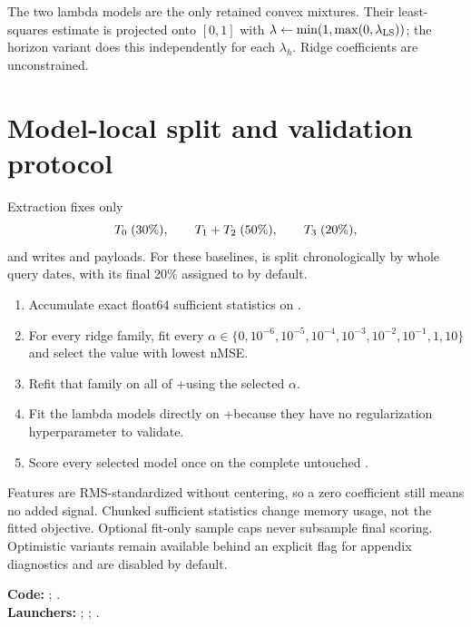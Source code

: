 \documentclass[10pt]{article}
\begin{document}
The two lambda models are the only retained convex mixtures. Their
least-squares estimate is projected onto $[0,1]$ with
$\lambda\leftarrow\min(1,\max(0,\lambda_{\rm LS}))$; the horizon variant
does this independently for each $\lambda_h$. Ridge coefficients are
unconstrained.

\section{Model-local split and validation protocol}
Extraction fixes only
\[
 T_0\;(30\%),\qquad T_1+T_2\;(50\%),\qquad T_3\;(20\%),
\]
and writes  and  payloads. For these baselines,
 is split chronologically by whole query dates, with its final
20\% assigned to \Ttwo by default.

\begin{enumerate}
\item Accumulate exact float64 sufficient statistics on \Tone.
\item For every ridge family, fit every
$\alpha\in\{0,10^{-6},10^{-5},10^{-4},10^{-3},10^{-2},10^{-1},1,10\}$ and
select the value with lowest \Ttwo nMSE.
\item Refit that family on all of \Tone+\Ttwo using the selected $\alpha$.
\item Fit the lambda models directly on \Tone+\Ttwo because they have no
regularization hyperparameter to validate.
\item Score every selected model once on the complete untouched \Tthree.
\end{enumerate}

Features are RMS-standardized without centering, so a zero coefficient still
means no added signal. Chunked sufficient statistics change memory usage, not
the fitted objective. Optional fit-only sample caps never subsample final
\Tthree scoring. Optimistic  variants remain available behind
an explicit flag for appendix diagnostics and are disabled by default.

\textbf{Code:} ;
.\\
\textbf{Launchers:} ; ;
.
\end{document}
